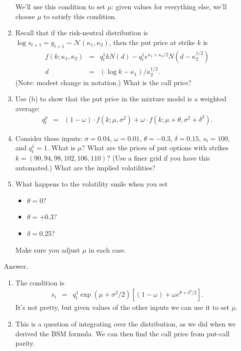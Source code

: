 \documentclass[11pt]{article}
\begin{document}
\begin{enumerate}
\begin{enumerate}
We'll use this condition to set $\mu$:
given values for everything else, we'll choose $\mu$ to satisfy this condition.

\item Recall that if the risk-neutral distribution is
 $\log s_{t+1} = y_{t+1} \sim \mathcal{N}(\kappa_1,\kappa_2)$,
 then the put price at strike $k$ is
\begin{eqnarray*}
    f(k; \kappa_1, \kappa_2) &=& q^1_t k N(d) - q^1_t e^{\kappa_1 + \kappa_2/2}
            N(d-\kappa_2^{1/2}) \\
            d&=& (\log k - \kappa_1)/\kappa_2^{1/2} .
\end{eqnarray*}
(Note:  modest change in notation.)
What is the call price?

\item
Use (b) to show that the put price in the mixture model is a weighted average:
\begin{eqnarray*}
    q^p_t &=& (1-\omega) \cdot f(k; \mu, \sigma^2) +
        \omega \cdot f(k; \mu+\theta, \sigma^2 + \delta^2) .
\end{eqnarray*}

\item Consider these inputs:
$\sigma = 0.04$, $\omega = 0.01$,
$\theta = -0.3$, $\delta = 0.15$,
$s_t = 100$, and $q^1_t = 1$.
What is $\mu$?
What are the prices of put options with strikes
$ k = (90, 94, 98, 102, 106, 110)$?
(Use a finer grid if you have this automated.)
What are the implied volatilities?

\item What happens to the volatility smile when you set
\begin{itemize}
\item $\theta = 0$?
\item $\theta = + 0.3$?
\item $\delta = 0.25$?
\end{itemize}
Make sure you adjust $\mu$ in each case.
\end{enumerate}
%
Answer.
\begin{enumerate}
\item The condition is
\begin{eqnarray*}
    s_t &=& q^1_t \exp( \mu + \sigma^2 / 2 )
            \left[ (1-\omega) + \omega e^{ \theta + \delta^2 / 2 } \right] .
\end{eqnarray*}
It's not pretty, but given values of the other inputs we can use it to set $\mu$.

\item This is a question of integrating over the distribution,
as we did when we derived the BSM formula.
We can then find the call price from put-call parity.


\end{enumerate}
\end{enumerate}
\end{document}

